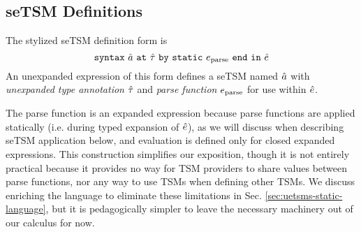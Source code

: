 
\subsection{seTSM Definitions}\label{sec:U-uetsm-definition}
The stylized seTSM definition form is \[\texttt{syntax}~\hat{a}~\texttt{at}~{\hat\tau}~\texttt{by}~\texttt{static}~e_\text{parse}~\texttt{end}~\texttt{in}~{\hat e}\] 
An unexpanded expression of this form defines a {seTSM} named $\hat{a}$ with \emph{unexpanded type annotation} ${\hat\tau}$ and \emph{parse function} $e_\text{parse}$ for use within ${\hat e}$. 

The parse function is an expanded expression because parse functions are applied statically (i.e. during typed expansion of ${\hat e}$), as we will discuss when describing seTSM application below, and evaluation is defined only for closed expanded expressions. This construction simplifies our exposition, though it is not entirely practical because it provides no way for TSM providers to share values between parse functions, nor any way to use TSMs when defining other TSMs. We discuss enriching the language to eliminate these limitations in Sec. \ref{sec:uetsms-static-language}, but it is pedagogically simpler to leave the necessary machinery out of our calculus for now.%

